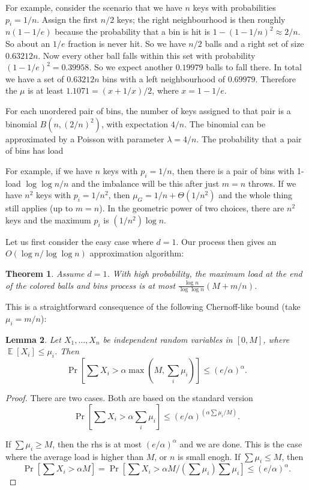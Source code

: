 \documentclass[10pt,conference,letterpaper]{IEEEtran}
\DeclareMathOperator*{\expect}{\mathbb{E}}
\newtheorem{theorem}{Theorem}[section]
\newtheorem{lemma}[theorem]{Lemma}
\begin{document}
{{For example, consider the scenario that we have $n$ keys with probabilities $p_i = 1 / n$. Assign the first $n/2$ keys; the right neighbourhood is
then roughly $n (1-1/e)$ because the probability that a bin is hit is $1-(1-1/n)^2 \approx 2/n$. So about an $1/e$ fraction is never hit. So we have
$n/2$ balls and a right set of size $0.63212 n$. Now every other ball falls within this set with probability $(1-1/e)^2=0.39958$. So we expect another
$0.19979$ balls to fall there. In total we have a set of $0.63212 n$ bins with a left neighbourhood of $0.69979$. Therefore the $\mu$
is at least $1.1071 = (x+1/x)/2$, where $x=1-1/e$.

For each unordered pair of bins, the number of keys assigned to that
pair is a binomial $B(n, (2/n)^2)$, with expectation $4/n$. The binomial can be approximated by a Poisson with parameter $\lambda = 4/n$.
The probability that a pair of bins has load

For example, if we have $n$ keys with $p_i = 1/n$, then there is a pair of bins with 1-load $\log \log n / n$ and the imbalance will be this after just $m = n$ throws.
If we have $n^2$ keys with $p_i = 1 / n^2$, then $\mu_G = 1/n + \Theta(1/n^2)$ and the whole thing still applies (up to $m = n$).
In the geometric power of two choices, there are $n^2$ keys and the maximum $p_i$ is $(1/n^2) \log n$.




Let us first consider the easy case where $d = 1$. Our process then gives an $O(\log n / \log \log n)$ approximation algorithm:
\begin{theorem}
Assume $d = 1$. With high probability, the maximum load at the end of the colored balls and bins process is at most $\frac{\log n}{\log \log n} (M + m
        / n)$.
\end{theorem}

This is a straightforward consequence of the following Chernoff-like bound (take $\mu_i = m/n$):
\begin{lemma}
Let $X_1, \ldots, X_n$ be independent random variables in $[0, M]$, where $\expect[X_i] \le \mu_i$.
Then
$$ \Pr\left[ \sum X_i > \alpha \max(M, \sum_i \mu_i) \right] \le (e / \alpha)^\alpha. $$
\end{lemma}
\begin{proof}
There are two cases. Both are based on the standard version
$$ \Pr[ \sum X_i > \alpha \sum_i \mu_i ] \le (e / \alpha)^{(\alpha \sum \mu_i / M)}. $$

If $\sum \mu_i \ge M$, then the rhs is at most $(e/\alpha)^\alpha$ and we are done. This is the case where the average load is higher than $M$, or $n$
is small enogh.
If $\sum \mu_i \le M$, then
$$ \Pr[ \sum X_i > \alpha M ] = \Pr[ \sum X_i > \alpha M / (\sum \mu_i) \sum\mu_i ] \le (e / \alpha)^\alpha. $$
\end{proof}
}

}
\end{document}
